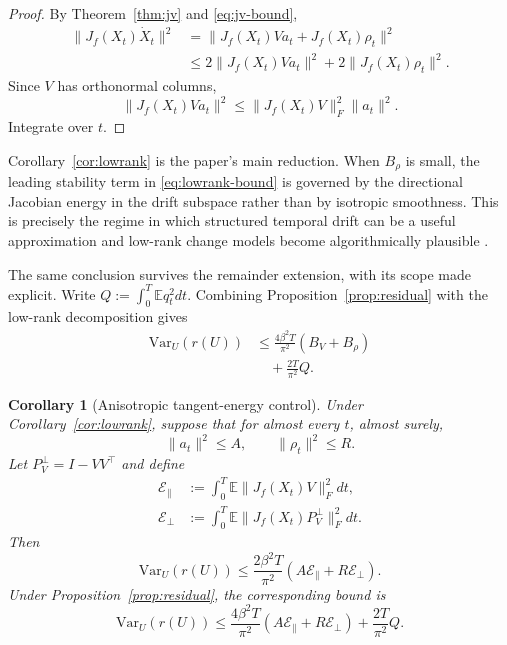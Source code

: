 \documentclass[conference]{IEEEtran}
\newtheorem{corollary}{Corollary}
\newcommand{\E}{\mathbb{E}}
\newcommand{\Var}{\mathrm{Var}}
\begin{document}
\begin{proof}
By Theorem~\ref{thm:jv} and \eqref{eq:jv-bound},
\[
\begin{aligned}
\|J_f(X_t)\dot X_t\|^2
&=
\|J_f(X_t)Va_t+J_f(X_t)\rho_t\|^2 \\
&\le
2\|J_f(X_t)Va_t\|^2+2\|J_f(X_t)\rho_t\|^2.
\end{aligned}
\]
Since $V$ has orthonormal columns,
\[
\|J_f(X_t)Va_t\|^2 \le \|J_f(X_t)V\|_F^2\|a_t\|^2.
\]
Integrate over $t$.
\end{proof}

Corollary~\ref{cor:lowrank} is the paper's main reduction. When $B_\rho$ is small, the leading stability term in \eqref{eq:lowrank-bound} is governed by the directional Jacobian energy in the drift subspace rather than by isotropic smoothness. This is precisely the regime in which structured temporal drift can be a useful approximation \cite{yao-wildtime} and low-rank change models become algorithmically plausible \cite{xie-lowrank-allerton2016}.

The same conclusion survives the remainder extension, with its scope made explicit. Write $Q:=\int_0^T\E q_t^2dt$. Combining Proposition~\ref{prop:residual} with the low-rank decomposition gives
\begin{equation}
\label{eq:residual-lowrank-bound}
\begin{split}
\Var_U(r(U))
&\le
\frac{4\beta^2T}{\pi^2}(B_V+B_\rho)\\
&\quad+
\frac{2T}{\pi^2}Q.
\end{split}
\end{equation}

\begin{corollary}[Anisotropic tangent-energy control]
\label{cor:anisotropic}
Under Corollary~\ref{cor:lowrank}, suppose that for almost every $t$,
almost surely,
\[
\|a_t\|^2\le A,
\qquad
\|\rho_t\|^2\le R.
\]
Let $P_V^\perp=I-VV^\top$ and define
\[
\begin{aligned}
\mathcal E_\parallel
&:=\int_0^T\E\|J_f(X_t)V\|_F^2dt,\\
\mathcal E_\perp
&:=\int_0^T\E\|J_f(X_t)P_V^\perp\|_F^2dt.
\end{aligned}
\]
Then
\begin{equation}
\label{eq:anisotropic-bound}
\Var_U(r(U))
\le
\frac{2\beta^2T}{\pi^2}
\left(A\mathcal E_\parallel+R\mathcal E_\perp\right).
\end{equation}
Under Proposition~\ref{prop:residual}, the corresponding bound is
\begin{equation}
\label{eq:anisotropic-residual-bound}
\Var_U(r(U))
\le
\frac{4\beta^2T}{\pi^2}
\left(A\mathcal E_\parallel+R\mathcal E_\perp\right)
+\frac{2T}{\pi^2}Q.
\end{equation}
\end{corollary}
\end{document}
